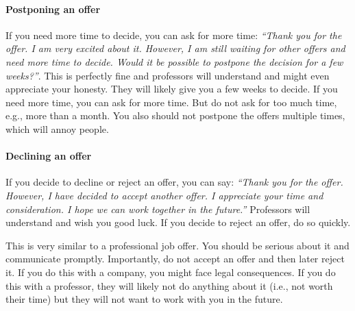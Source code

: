 \documentclass[oneside,11pt]{memoir}
\begin{document}

\paragraph{Postponing an offer} If you need more time to decide, you can ask for more time: \emph{``Thank you for the offer.  I am very excited about it.  However, I am still waiting for other offers and need more time to decide.  Would it be possible to postpone the decision for a few weeks?''}.  This is perfectly fine and professors will understand and might even appreciate your honesty.  They will likely give you a few weeks to decide.  If you need more time, you can ask for more time.  But do not ask for too much time, e.g., more than a month.  You also should not postpone the offers multiple times, which will annoy people.

\paragraph{Declining an offer} If you decide to decline or reject an offer, you can say: \emph{``Thank you for the offer. However, I have decided to accept another offer.  I appreciate your time and consideration.  I hope we can work together in the future.''}  Professors will understand and wish you good luck.  If you decide to reject an offer, do so quickly.

This is very similar to a professional job offer.  You should be serious about it and communicate promptly. Importantly, do not accept an offer and then later reject it.  If you do this with a company, you might face legal consequences.  If you do this with a professor, they will likely not do anything about it (i.e., not worth their time) but they will not want to work with you in the future.


\end{document}
